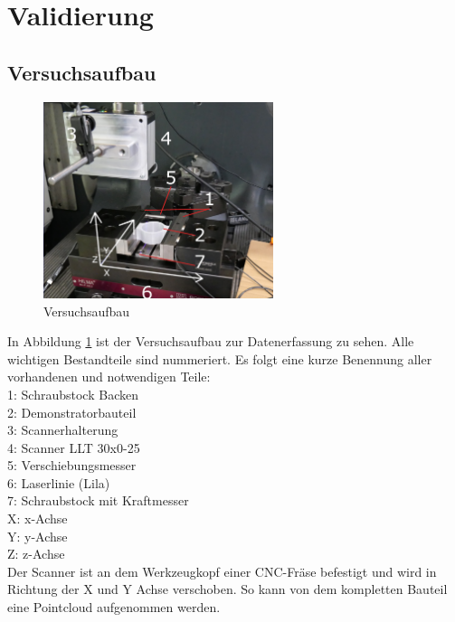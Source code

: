 \documentclass[../main.tex]{subfiles}
\begin{document}
\section{Validierung}

\subsection{Versuchsaufbau}

\begin{figure}
    \includegraphics[width=0.6\textwidth]{images/versuchsaufbau_foto.png.JPG}
    \caption{Versuchsaufbau}
    \label{fig:versuchsaufbau}
\end{figure}

In Abbildung \ref{fig:versuchsaufbau} ist der Versuchsaufbau zur Datenerfassung 
zu sehen. Alle wichtigen Bestandteile sind nummeriert. Es folgt eine kurze Benennung
aller vorhandenen und notwendigen Teile:\\
1: Schraubstock Backen\\
2: Demonstratorbauteil\\
3: Scannerhalterung\\
4: Scanner LLT 30x0-25\\
5: Verschiebungsmesser\\
6: Laserlinie (Lila)\\
7: Schraubstock mit Kraftmesser\\
X: x-Achse\\
Y: y-Achse\\
Z: z-Achse\\

Der Scanner ist an dem Werkzeugkopf einer CNC-Fräse befestigt und wird 
in Richtung der X und Y Achse verschoben. So kann von dem kompletten Bauteil eine 
Pointcloud aufgenommen werden.
\end{document}
